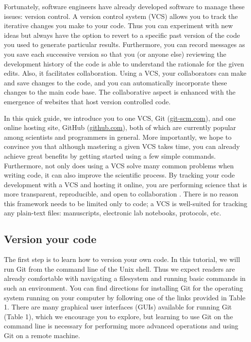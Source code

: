 \documentclass[10pt]{article}
\begin{document}
Fortunately, software engineers have already developed software to manage these issues: version control.
A version control system (VCS) allows you to track the iterative changes you make to your code.
Thus you can experiment with new ideas but always have the option to revert to a specific past version of the code you used to generate particular results.
Furthermore, you can record messages as you save each successive version so that you (or anyone else) reviewing the development history of the code is able to understand the rationale for the given edits.
Also, it facilitates collaboration.
Using a VCS, your collaborators can make and save changes to the code, and you can automatically incorporate these changes to the main code base.
The collaborative aspect is enhanced with the emergence of websites that host version controlled code.

In this quick guide, we introduce you to one VCS, Git (\href{https://git-scm.com/}{git-scm.com}), and one online hosting site, GitHub (\href{https://github.com}{github.com}), both of which are currently popular among scientists and programmers in general.
More importantly, we hope to convince you that although mastering a given VCS takes time, you can already achieve great benefits by getting started using a few simple commands.
Furthermore, not only does using a VCS solve many common problems when writing code, it can also improve the scientific process.
By tracking your code development with a VCS and hosting it online, you are performing science that is more transparent, reproducible, and open to collaboration \cite{23448176, 24415924}.
There is no reason this framework needs to be limited only to code; a VCS is well-suited for tracking any plain-text files: manuscripts, electronic lab notebooks, protocols, etc.


\subsection{Version your code}

The first step is to learn how to version your own code.
In this tutorial, we will run Git from the command line of the Unix shell.
Thus we expect readers are already comfortable with navigating a filesystem and running basic commands in such an environment.
You can find directions for installing Git for the operating system running on your computer by following one of the links provided in Table 1.
There are many graphical user interfaces (GUIs) available for running Git (Table 1), which we encourage you to explore, but learning to use Git on the command line is necessary for performing more advanced operations and using Git on a remote machine.
\end{document}
